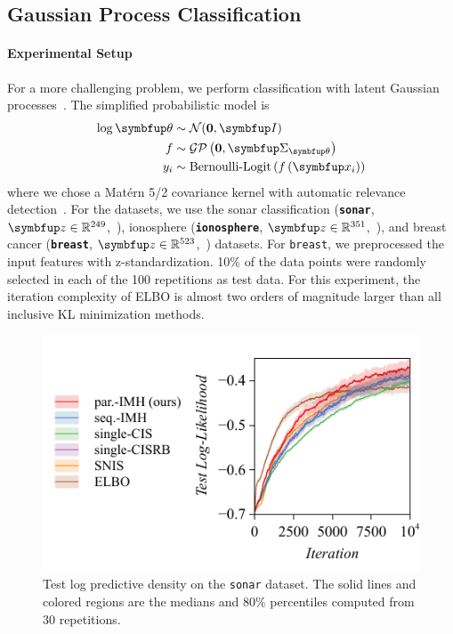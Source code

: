   \vspace{-0.05in}
\subsection{Gaussian Process Classification}\label{section:bgp}


  \vspace{-0.05in}
\paragraph{Experimental Setup}
For a more challenging problem, we perform classification with latent Gaussian processes~\citep{rasmussen_gaussian_2006, NIPS2014_8c6744c9}.
The simplified probabilistic model is
\begin{align*}
  \log \vtheta &\sim \mathcal{N}(\mathbf{0}, \mI) \\
   f &\sim \mathcal{GP}\left(\mathbf{0}, \mSigma_{\vtheta}\right) \\
   y_i &\sim \text{Bernoulli-Logit}\left(  f\left( \vx_i \right) \right)
\end{align*}
where we chose a Mat\'ern 5/2 covariance kernel with automatic relevance detection~\citep{neal_bayesian_1996}.
For the datasets, we use the sonar classification (\textbf{\texttt{sonar}}, \(\vz \in \mathbb{R}^{249}\),~\citealt{gorman_analysis_1988}), ionosphere (\textbf{\texttt{ionosphere}}, \(\vz \in \mathbb{R}^{351}\),~\citealt{Sigillito1989ClassificationOR}), and breast cancer (\textbf{\texttt{breast}}, \(\vz \in \mathbb{R}^{523}\),~\citealt{wolberg_multisurface_1990}) datasets.
For \texttt{breast}, we preprocessed the input features with z-standardization.
10\% of the data points were randomly selected in each of the 100 repetitions as test data.
For this experiment, the iteration complexity of ELBO is almost two orders of magnitude larger than all inclusive KL minimization methods.

%
\begin{figure}[H]
  \centering
     \includegraphics[scale=0.8]{figures/sonar_01.pdf}
  \caption{Test log predictive density on the \texttt{sonar} dataset.
    The solid lines and colored regions are the medians and 80\% percentiles computed from 30 repetitions.
  }\label{fig:gp}
\end{figure}
%
\vspace{-0.05in}
